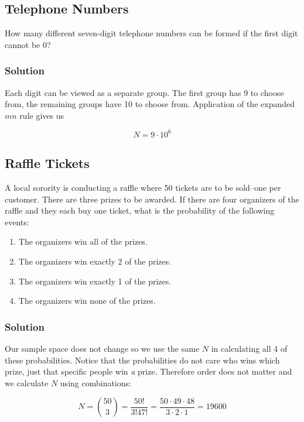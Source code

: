 \documentclass[11pt]{article}
\theoremstyle{definition}
\begin{document}
\subsection{Telephone Numbers}

How many different seven-digit telephone numbers can be formed if the first digit cannot be 0?

\subsubsection*{Solution}

Each digit can be viewed as a separate group. The first group has 9 to choose from, the remaining groups have 10 to choose from. Application of the expanded $mn$ rule gives us

$$
	N = 9 \cdot 10^6
$$

\subsection{Raffle Tickets}

A local sorority is conducting a raffle where 50 tickets are to be sold--one per customer. There are three prizes to be awarded. If there are four organizers of the raffle and they each buy one ticket, what is the probability of the following events:

\begin{enumerate}
	\item The organizers win all of the prizes.
	\item The organizers win exactly 2 of the prizes.
	\item The organizers win exactly 1 of the prizes.
	\item The organizers win none of the prizes.
\end{enumerate}

\subsubsection*{Solution}

Our sample space does not change so we use the same $N$ in calculating all 4 of these probabilities. Notice that the probabilities do not care who wins which prize, just that specific people win \textit{a} prize. Therefore order does not matter and we calculate $N$ using combinations:

$$
	N = {50 \choose 3} = \frac{50!}{3!47!} = \frac{50\cdot49\cdot48}{3\cdot2\cdot1} = 19600
$$
\end{document}
